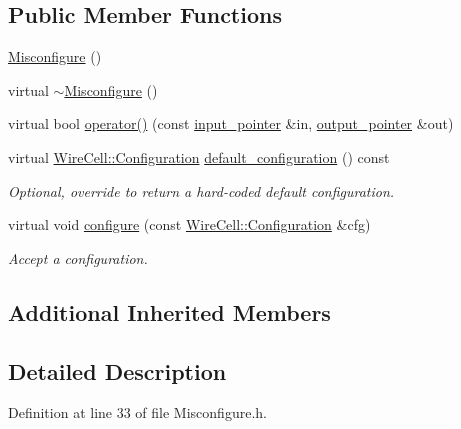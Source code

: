 \subsection*{Public Member Functions}
\begin{DoxyCompactItemize}
\item 
\hyperlink{class_wire_cell_1_1_gen_1_1_misconfigure_a4c5e3cd3af8d9f2276a2cde7b67d5931}{Misconfigure} ()
\item 
virtual \hyperlink{class_wire_cell_1_1_gen_1_1_misconfigure_af92d3b67537cc08366fe7f2261f70486}{$\sim$\+Misconfigure} ()
\item 
virtual bool \hyperlink{class_wire_cell_1_1_gen_1_1_misconfigure_accd856927007e514f179be951bff794b}{operator()} (const \hyperlink{class_wire_cell_1_1_i_function_node_a55c0946156df9b712b8ad1a0b59b2db6}{input\+\_\+pointer} \&in, \hyperlink{class_wire_cell_1_1_i_function_node_afc02f1ec60d31aacddf64963f9ca650b}{output\+\_\+pointer} \&out)
\item 
virtual \hyperlink{namespace_wire_cell_a9f705541fc1d46c608b3d32c182333ee}{Wire\+Cell\+::\+Configuration} \hyperlink{class_wire_cell_1_1_gen_1_1_misconfigure_acf1e6224e2aaadd3162e17f79dc4557b}{default\+\_\+configuration} () const
\begin{DoxyCompactList}\small\item\em Optional, override to return a hard-\/coded default configuration. \end{DoxyCompactList}\item 
virtual void \hyperlink{class_wire_cell_1_1_gen_1_1_misconfigure_a99eea8b08c7ca7a5ea9bbc79e7bce228}{configure} (const \hyperlink{namespace_wire_cell_a9f705541fc1d46c608b3d32c182333ee}{Wire\+Cell\+::\+Configuration} \&cfg)
\begin{DoxyCompactList}\small\item\em Accept a configuration. \end{DoxyCompactList}\end{DoxyCompactItemize}
\subsection*{Additional Inherited Members}


\subsection{Detailed Description}


Definition at line 33 of file Misconfigure.\+h.



